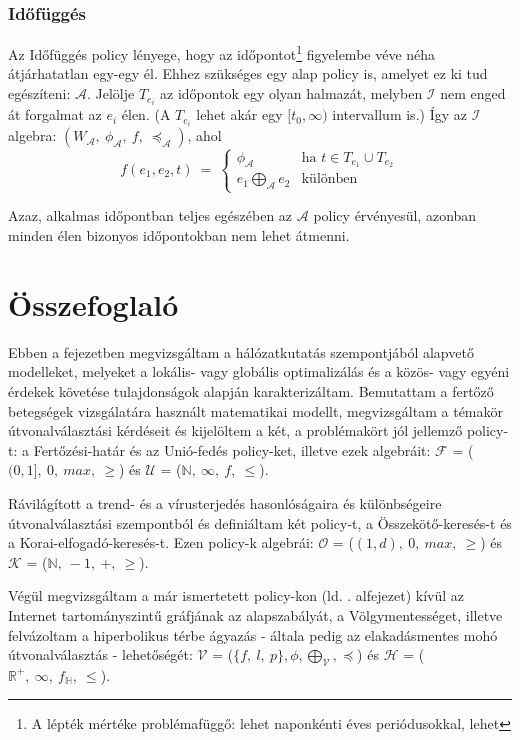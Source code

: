       \subsubsection{Időfüggés}
      Az Időfüggés policy lényege, hogy az időpontot\footnote{A lépték mértéke problémafüggő: lehet naponkénti éves periódusokkal, lehet } figyelembe véve néha átjárhatatlan egy-egy él. Ehhez szükséges egy alap policy is, amelyet ez ki tud egészíteni: $\mathcal{A}$. Jelölje $T_{e_i}$ az időpontok egy olyan halmazát, melyben $\mathcal{I}$ nem enged át forgalmat az $e_i$ élen. (A $T_{e_i}$ lehet akár egy $[t_0, \infty)$ intervallum is.) Így az $\mathcal{I}$ algebra: $(W_{\mathcal{A}},~\phi_{\mathcal{A}},~f,~\preceq_{\mathcal{A}})$, ahol
      $$f(e_1,e_2,t)~=~
      \begin{cases}
        \phi_{\mathcal{A}} & \text{ha } t \in T_{e_1} \cup T_{e_2}\\
        e_1 \bigoplus_{\mathcal{A}} e_2 & \text{különben}
      \end{cases}$$

      Azaz, alkalmas időpontban teljes egészében az $\mathcal{A}$ policy érvényesül, azonban minden élen bizonyos időpontokban nem lehet átmenni.\\

  \section{Összefoglaló}

  Ebben a fejezetben megvizsgáltam a hálózatkutatás szempontjából alapvető modelleket, melyeket a lokális- vagy globális optimalizálás és a közös- vagy egyéni érdekek követése tulajdonságok alapján karakterizáltam. Bemutattam a fertőző betegségek vizsgálatára használt matematikai modellt, megvizsgáltam a témakör útvonalválasztási kérdéseit és kijelöltem a két, a problémakört jól jellemző policy-t: a Fertőzési-határ és az Unió-fedés policy-ket, illetve ezek algebráit: $\mathcal{F}$ = ($(0,1],~0,~max,~\geq$) és $\mathcal{U}$ = ($\mathbb{N},~\infty,~f,~\leq$).

  Rávilágított a trend- és a vírusterjedés hasonlóságaira és különbségeire útvonalválasztási szempontból és definiáltam két policy-t, a Összekötő-keresés-t és a Korai-elfogadó-keresés-t. Ezen policy-k algebrái: $\mathcal{O}$ = ($(1,d),~0,~max,~\geq$) és $\mathcal{K}$ = ($\mathbb{N},~-1,~+,~\geq$).

  Végül megvizsgáltam a már ismertetett policy-kon (ld. . alfejezet) kívül az Internet tartományszintű gráfjának az alapszabályát, a Völgymentességet, illetve felvázoltam a hiperbolikus térbe ágyazás - általa pedig az elakadásmentes mohó útvonalválasztás - lehetőségét: $\mathcal{V}$ = ($\{f,~l,~p\},\phi,\bigoplus_{\mathcal{V}},\preceq$) és $\mathcal{H}$ = ($\mathbb{R}^{+},~\infty,~f_{\mathbb{H}},~\leq$).
